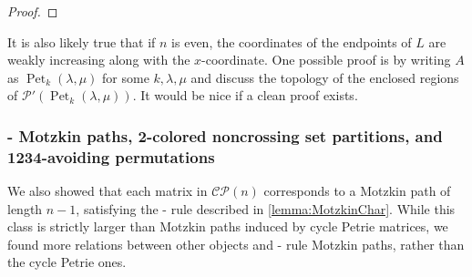 \documentclass[pdflatex,sn-mathphys-num]{sn-jnl}%
\theoremstyle{thmstyleone}%
\theoremstyle{thmstyletwo}%
\theoremstyle{thmstylethree}%
\numberwithin{equation}{section}
\DeclareMathOperator{\Pet}{Pet}
\begin{document}
\begin{proof}
            
        \end{proof}

        It is also likely true that if $n$ is even, the coordinates of the endpoints of $L$ are weakly increasing along with the $x$-coordinate. One possible proof is by writing $A$ as $\Pet_k(\lambda,\mu)$ for some $k,\lambda,\mu$ and discuss the topology of the enclosed regions of $\mathcal{P}'(\Pet_k(\lambda,\mu))$. It would be nice if a clean proof exists.
        \subsubsection{\red-\blue{} Motzkin paths, 2-colored noncrossing set partitions, and 1234-avoiding permutations} 
            We also showed that each matrix in $\mathcal{CP}(n)$ corresponds to a Motzkin path of length $n-1$, satisfying the \red-\blue{} rule described in \cref{lemma:MotzkinChar}. While this class is strictly larger than Motzkin paths induced by cycle Petrie matrices, we found more relations between other objects and \red-\blue{} rule Motzkin paths, rather than the cycle Petrie ones.
            
\end{document}
